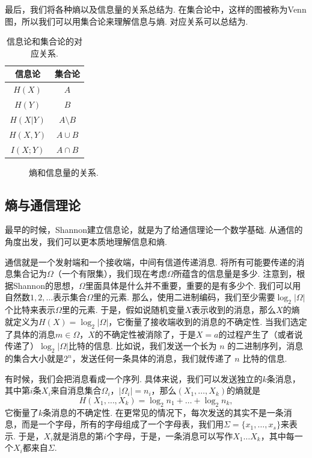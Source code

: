 最后，我们将各种熵以及信息量的关系总结为. 在集合论中，这样的图被称为Venn图，所以我们可以用集合论来理解信息与熵. 对应关系可以总结为.
\begin{table}[ht]
    \centering
        \begin{tabular}{c|c}
        \toprule
        信息论&集合论\\
        \midrule
        $H(X)$&$A$\\
        $H(Y)$&$B$\\
        $H(X|Y)$&$A\setminus B$\\
        $H(X,Y)$&$A\cup B$\\
        $I(X;Y)$&$A\cap B$\\
        \bottomrule
        \end{tabular}
    \caption{信息论和集合论的对应关系.}
    \label{tab:entropy-relation}
\end{table}
\begin{figure}[ht]
    \centering
    
    \caption{熵和信息量的关系.}
    \label{fig:entropy-relation}
\end{figure}

\subsection{熵与通信理论}\label{subsec:entropy-and-communication}
最早的时候，Shannon建立信息论，就是为了给通信理论一个数学基础. 从通信的角度出发，我们可以更本质地理解信息和熵. 

通信就是一个发射端和一个接收端，中间有信道传递消息. 将所有可能要传递的消息集合记为$\Omega$（一个有限集），我们现在考虑$\Omega$所蕴含的信息量是多少. 注意到，根据Shannon的思想，$\Omega$里面具体是什么并不重要，重要的是有多少个. 我们可以用自然数$1,2,\dots$表示集合$\Omega$里的元素. 那么，使用二进制编码，我们至少需要$\log_2 |\Omega|$个比特来表示$\Omega$里的元素. 于是，假如说随机变量$X$表示收到的消息，那么$X$的熵就定义为$H(X)=\log_2 |\Omega|$，它衡量了接收端收到的消息的不确定性. 当我们选定了具体的消息$m\in \Omega$，$X$的不确定性被消除了，于是$X=a$的过程产生了（或者说传递了）$\log_2 |\Omega|$比特的信息. 比如说，我们发送一个长为 $n$ 的二进制序列，消息的集合大小就是$2^n$，发送任何一条具体的消息，我们就传递了 $n$ 比特的信息.

有时候，我们会把消息看成一个序列. 具体来说，我们可以发送独立的$k$条消息，其中第$i$条$X_i$来自消息集合$\Omega_i$，$|\Omega_i|=n_i$，那么$(X_1,\dots,X_k)$的熵就是
\[H(X_1,\dots,X_k)=\log_2 n_1+\dots+\log_2 n_k,\]
它衡量了$k$条消息的不确定性. 在更常见的情况下，每次发送的其实不是一条消息，而是一个字母，所有的字母组成了一个字母表，我们用$\Sigma=\{x_1,\dots,x_s\}$来表示. 于是，$X_i$就是消息的第$i$个字母，于是，一条消息可以写作$X_1\dots X_k$，其中每一个$X_i$都来自$\Sigma$.

